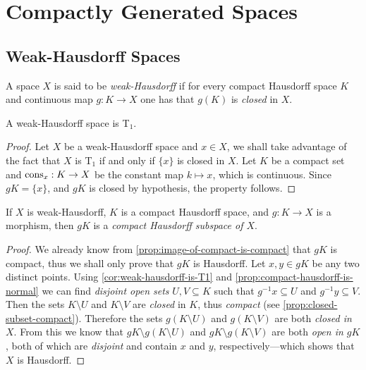 \section{Compactly Generated Spaces}

\subsection{Weak-Hausdorff Spaces}

\begin{definition}
\label{def:weak-hausdorff}
A space \(X\) is said to be \emph{weak-Hausdorff} if for every compact Hausdorff
space \(K\) and continuous map \(g: K \to X\) one has that \(g(K)\) is
\emph{closed} in \(X\).
\end{definition}

\begin{corollary}
\label{cor:weak-hausdorff-is-T1}
A weak-Hausdorff space is T\(_1\).
\end{corollary}

\begin{proof}
Let \(X\) be a weak-Hausdorff space and \(x \in X\), we shall take advantage of
the fact that \(X\) is T\(_1\) if and only if \(\{x\}\) is closed in \(X\). Let
\(K\) be a compact set and \(\operatorname{cons}_x: K \to X\) be the constant map \(k \mapsto
x\), which is continuous. Since \(g K = \{x\}\), and \(g K\) is closed by
hypothesis, the property follows.
\end{proof}

\begin{lemma}
\label{lem:weak-haudorff-has-compact-hausdorff-subspace}
If \(X\) is weak-Hausdorff, \(K\) is a compact Hausdorff space, and
\(g: K \to X\) is a morphism, then \(g K\) is a \emph{compact Hausdorff subspace
  of \(X\)}.
\end{lemma}

\begin{proof}
We already know from \cref{prop:image-of-compact-is-compact} that \(g K\) is
compact, thus we shall only prove that \(g K\) is Hausdorff. Let
\(x, y \in g K\) be any two distinct points. Using
\cref{cor:weak-hausdorff-is-T1} and \cref{prop:compact-hausdorff-is-normal} we
can find \emph{disjoint open sets} \(U, V \subseteq K\) such that
\(g^{-1}x \subseteq U\) and \(g^{-1}y \subseteq V\). Then the sets
\(K \setminus U\) and \(K \setminus V\) are \emph{closed} in \(K\), thus
\emph{compact} (see \cref{prop:closed-subset-compact}). Therefore the sets
\(g(K \setminus U)\) and \(g(K \setminus V)\) are both \emph{closed in
  \(X\)}. From this we know that \(g K \setminus g(K \setminus U)\) and
\(g K \setminus g(K \setminus V)\) are both \emph{open in \(g K\)}, both of
which are \emph{disjoint} and contain \(x\) and \(y\), respectively---which
shows that \(X\) is Hausdorff.
\end{proof}

